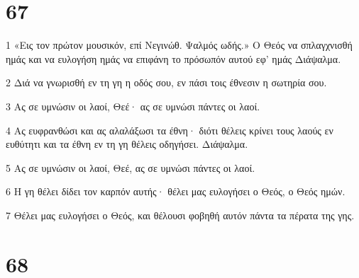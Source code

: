 \chapter{67}

\par 1 «Εις τον πρώτον μουσικόν, επί Νεγινώθ. Ψαλμός ωδής.» Ο Θεός να σπλαγχνισθή ημάς και να ευλογήση ημάς να επιφάνη το πρόσωπόν αυτού εφ' ημάς Διάψαλμα.
\par 2 Διά να γνωρισθή εν τη γη η οδός σου, εν πάσι τοις έθνεσιν η σωτηρία σου.
\par 3 Ας σε υμνώσιν οι λαοί, Θεέ· ας σε υμνώσι πάντες οι λαοί.
\par 4 Ας ευφρανθώσι και ας αλαλάξωσι τα έθνη· διότι θέλεις κρίνει τους λαούς εν ευθύτητι και τα έθνη εν τη γη θέλεις οδηγήσει. Διάψαλμα.
\par 5 Ας σε υμνώσιν οι λαοί, Θεέ, ας σε υμνώσι πάντες οι λαοί.
\par 6 Η γη θέλει δίδει τον καρπόν αυτής· θέλει μας ευλογήσει ο Θεός, ο Θεός ημών.
\par 7 Θέλει μας ευλογήσει ο Θεός, και θέλουσι φοβηθή αυτόν πάντα τα πέρατα της γης.

\chapter{68}

